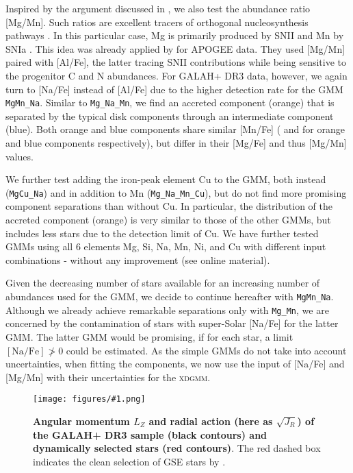 \documentclass[fleqn,usenatbib]{mnras}
\newcommand{\codeicon}{{\faCloudDownload}}
\newcommand{\codelink}[1]{\href{https://github.com/svenbuder/Accreted-stars-in-GALAH-DR3/tree/main/figures/#1.ipynb}{\codeicon}\,\,}
\newcommand{\oscaption}[2]{\caption{#2 \codelink{#1}}}
\newcommand{\figurecolumnwidth}[3]{\begin{figure} \centering \texttt{[image: figures/\#1.png]}\oscaption{#2}{#3}\label{fig:#1} \end{figure}}
\begin{document}
Inspired by the argument discussed in \citet{Hawkins2015}, we also test the abundance ratio [Mg/Mn]. Such ratios are excellent tracers of orthogonal nucleosynthesis pathways \citep[e.g.][]{Ting2012, Ting2015}. In this particular case, Mg is primarily produced by SNII \citep{Nomoto2013} and Mn by SNIa \citep{Gratton1989}. This idea was already applied by \citet{Das2020} for APOGEE data. They used [Mg/Mn] paired with [Al/Fe], the latter tracing SNII contributions while being sensitive to the progenitor C and N abundances. For GALAH+ DR3 data, however, we again turn to [Na/Fe] instead of [Al/Fe] due to the higher detection rate for the GMM \texttt{MgMn\_Na}. Similar to \texttt{Mg\_Na\_Mn}, we find an accreted component (orange) that is separated by the typical disk components through an intermediate component (blue). Both orange and blue components share similar [Mn/Fe] ( and  for orange and blue components respectively), but differ in their [Mg/Fe] and thus [Mg/Mn] values.

We further test adding the iron-peak element Cu to the GMM, both instead (\texttt{MgCu\_Na}) and in addition to Mn (\texttt{Mg\_Na\_Mn\_Cu}), but do not find more promising component separations than without Cu. In particular, the distribution of the accreted component (orange) is very similar to those of the other GMMs, but includes less stars due to the detection limit of Cu. We have further tested GMMs using all 6 elements Mg, Si, Na, Mn, Ni, and Cu with different input combinations - without any improvement (see online material).

Given the decreasing number of stars available for an increasing number of abundances used for the GMM, we decide to continue hereafter with \texttt{MgMn\_Na}. Although we already achieve remarkable separations only with \texttt{Mg\_Mn}, we are concerned by the contamination of stars with super-Solar [Na/Fe] for the latter GMM. The latter GMM would be promising, if for each star, a limit $\mathrm{[Na/Fe]} \ngtr 0$ could be estimated. As the simple GMMs do not take into account uncertainties, when fitting the components, we now use the input of [Na/Fe] and [Mg/Mn] with their uncertainties for the \textsc{xdgmm}.

\figurecolumnwidth{Dyn_L_Z_sqrtJ_R}{chronochemodynamic_comparison}{
\textbf{Angular momentum $L_Z$ and radial action (here as $\sqrt{J_R}$) of the GALAH+ DR3 sample (black contours) and dynamically selected stars (red contours)}. The red dashed box indicates the clean selection of GSE stars by \citet{Feuillet2021}.
}
\end{document}
